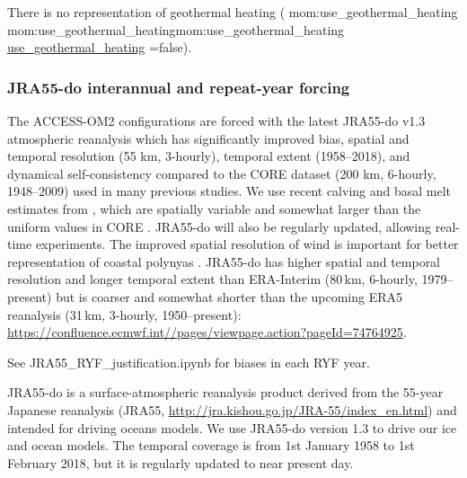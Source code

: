 \documentclass[11pt]{article}
\makeatletter
\newcommand*{\make@hex@label}[1]{%
  \def\hex@label{#1}%
  \@onelevel@sanitize\hex@label
  \EdefEscapeHex\hex@label{\hex@label}%
}
\newcommand*{\hexhyperlink}[2]{%
  \make@hex@label{#1}%
  \hyperlink{\hex@label}{#2}%
}
\newcommand{\momlink}[2]{\hexhyperlink{mom:#2}{#1}}
\newcommand{\paramsty}[1]{\textsf{#1}}
\newcommand{\mom}[1]{\paramsty{\momlink{#1}{#1}}\index{\paramsty{#1}}}
\makeatother
\begin{document}


There is no representation of geothermal heating (\mom{use_geothermal_heating}=false).


\subsubsection{JRA55-do interannual and repeat-year forcing}

The ACCESS-OM2 configurations are forced with the latest JRA55-do v1.3 atmospheric reanalysis \citep{TsujinoETAL2018a} which has significantly improved bias, spatial and temporal resolution (55 km, 3-hourly), temporal extent (1958--2018), and dynamical self-consistency compared to the CORE dataset (200 km, 6-hourly, 1948--2009) used in many previous studies. We use recent calving and basal melt estimates from \citet{DepoorterBamberGriggsLenaertsLigtenbergBroekeMoholdt2013a}, which are spatially variable and somewhat larger than the uniform values in CORE \citep{TsujinoETAL2018a}. JRA55-do will also be regularly updated, allowing real-time experiments. The improved spatial resolution of wind is important for better representation of coastal polynyas \citep{StosselZhangVihma2011a, ZhangVihmaStosselUotila2015a}.
JRA55-do has higher spatial and temporal resolution and longer temporal extent than ERA-Interim (80\,km, 6-hourly, 1979--present) %
but is coarser and somewhat shorter than the upcoming ERA5 reanalysis (31\,km, 3-hourly, 1950--present): \url{https://confluence.ecmwf.int//pages/viewpage.action?pageId=74764925}.%


See JRA55_RYF_justification.ipynb for biases in each RYF year.

JRA55-do \citep{TsujinoETAL2018a} is a surface-atmospheric reanalysis product derived from the 55-year Japanese reanalysis (JRA55, \url{http://jra.kishou.go.jp/JRA-55/index_en.html}) and intended for driving oceans models. 
We use JRA55-do version 1.3 to drive our ice and ocean models.
The temporal coverage is from 1st January 1958 to 1st February 2018, but it is regularly updated to near present day.
\end{document}
